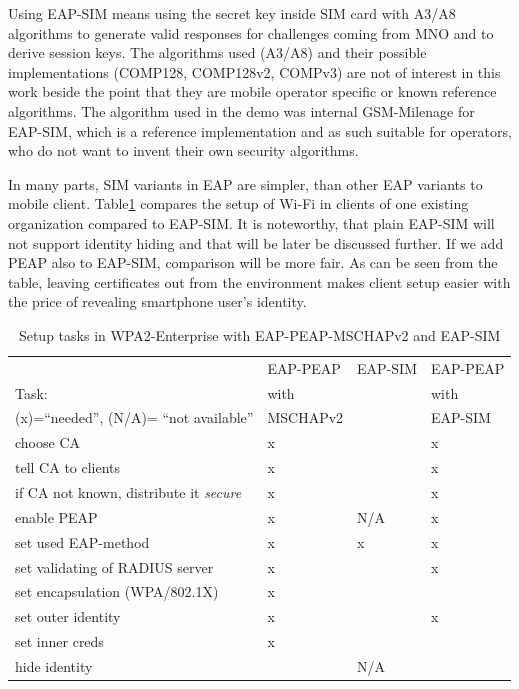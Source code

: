 \documentclass[12pt,a4paper,english]{tutthesis}
\begin{document}
  Using EAP-SIM means using the secret key inside SIM card with A3/A8
algorithms to generate valid responses for challenges coming from MNO
and to derive session keys.  The algorithms used (A3/A8) and their
possible implementations (COMP128, COMP128v2, COMPv3) are not of
interest in this work beside the point that they are mobile operator
specific or known reference algorithms.
The algorithm used in the demo was internal GSM-Milenage for EAP-SIM,
which is a reference implementation and as such suitable for operators, who do not 
want to invent their own security algorithms. 


In many parts, SIM variants in EAP are simpler, than other EAP
variants to mobile client.  Table\ref{table-peapsim} compares the setup of Wi-Fi
in clients of one existing organization compared to EAP-SIM. It
is noteworthy, that plain EAP-SIM will not support identity hiding and
that will be later be discussed further. If we add PEAP \cite{peap}
also to EAP-SIM, comparison will be more fair.
As can be seen from the table, leaving certificates out from the environment
makes client setup easier with the price of revealing smartphone user's
identity.  



\begin{table}[htb]
\caption{\label{table-peapsim}Setup tasks in  WPA2-Enterprise with EAP-PEAP-MSCHAPv2 and EAP-SIM}
\centering
\begin{tabular}{llll}
 & EAP-PEAP & EAP-SIM & EAP-PEAP\\
Task: & with &  & with\\
(x)=``needed'', (N/A)= ``not available'' & MSCHAPv2 &  & EAP-SIM\\
\hline
choose CA & x &  & x\\
tell CA to clients & x &  & x\\
if CA not known, distribute it \emph{secure} & x &  & x\\
enable PEAP & x & N/A & x\\
set used EAP-method & x & x & x\\
set validating of RADIUS server & x &  & x\\
set encapsulation (WPA/802.1X) & x &  & \\
set outer identity & x &  & x\\
set inner creds & x &  & \\
hide identity &  & N/A & \\
\hline
\end{tabular}
\end{table}
\end{document}
